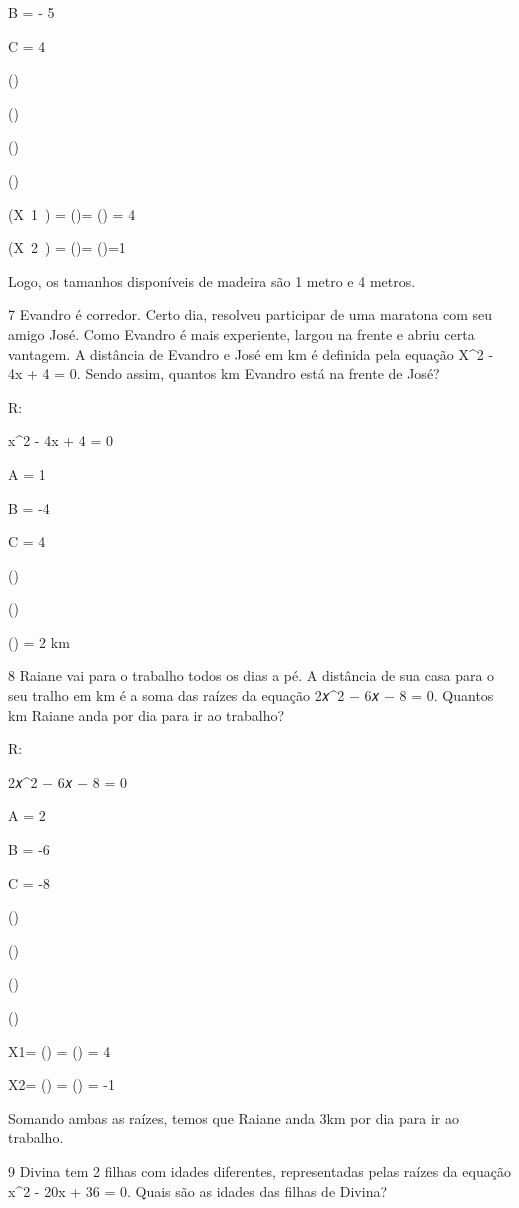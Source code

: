 {B = - 5

C = 4

()

()

()

()

(X~1~) = ()= () = 4

(X~2~) = ()= ()=1

Logo, os tamanhos disponíveis de madeira são 1 metro e 4 metros.

\num{7} Evandro é corredor. Certo dia, resolveu participar de uma maratona
com seu amigo José. Como Evandro é mais experiente, largou na frente e
abriu certa vantagem. A distância de Evandro e José em km é definida
pela equação X^2 - 4x + 4 = 0. Sendo assim, quantos km Evandro está na
frente de José?

R:

x^2 - 4x + 4 = 0

A = 1

B = -4

C = 4

()

()

() = 2 km

\num{8} Raiane vai para o trabalho todos os dias a pé. A distância de sua
casa para o seu tralho em km é a soma das raízes da equação 2𝑥^2 − 6𝑥 − 8
= 0. Quantos km Raiane anda por dia para ir ao trabalho?

R:

2𝑥^2 − 6𝑥 − 8 = 0

A = 2

B = -6

C = -8

()

()

()

()

X1= () = () = 4

X2= () = () = -1

Somando ambas as raízes, temos que Raiane anda 3km por dia para ir ao
trabalho.

\num{9} Divina tem 2 filhas com idades diferentes, representadas pelas raízes
da equação x^2 - 20x + 36 = 0. Quais são as idades das filhas de Divina?

}
